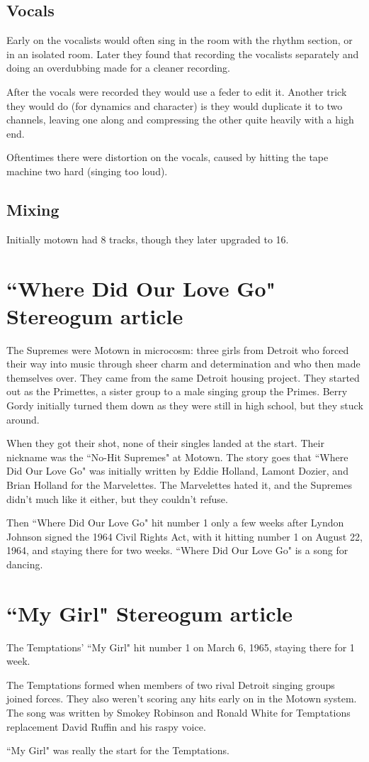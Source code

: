 \documentclass[12pt, a4paper, twoside, openright, titlepage]{book}
\begin{document}
\subsection{Vocals}

Early on the vocalists would often sing in the room with the rhythm section, or in an isolated room. Later they found that recording the vocalists separately and doing an overdubbing made for a cleaner recording.

After the vocals were recorded they would use a feder to edit it. Another trick they would do (for dynamics and character) is they would duplicate it to two channels, leaving one along and compressing the other quite heavily with a high end.

Oftentimes there were distortion on the vocals, caused by hitting the tape machine two hard (singing too loud). 


\subsection{Mixing}

Initially motown had 8 tracks, though they later upgraded to 16. 


\section{``Where Did Our Love Go" Stereogum article}

The Supremes were Motown in microcosm: three girls from Detroit who forced their way into music through sheer charm and determination and who then made themselves over. They came from the same Detroit housing project. They started out as the Primettes, a sister group to a male singing group the Primes. Berry Gordy initially turned them down as they were still in high school, but they stuck around. 

When they got their shot, none of their singles landed at the start. Their nickname was the ``No-Hit Supremes" at Motown. The story goes that ``Where Did Our Love Go" was initially written by Eddie Holland, Lamont Dozier, and Brian Holland for the Marvelettes. The Marvelettes hated it, and the Supremes didn't much like it either, but they couldn't refuse. 

Then ``Where Did Our Love Go" hit number 1 only a few weeks after Lyndon Johnson signed the 1964 Civil Rights Act, with it hitting number 1 on August 22, 1964, and staying there for two weeks. ``Where Did Our Love Go" is a song for dancing. 


\section{``My Girl" Stereogum article}

The Temptations' ``My Girl" hit number 1 on March 6, 1965, staying there for 1 week.


The Temptations formed when members of two rival Detroit singing groups joined forces. They also weren't scoring any hits early on in the Motown system. The song was written by Smokey Robinson and Ronald White for Temptations replacement David Ruffin and his raspy voice. 

``My Girl" was really the start for the Temptations.
\end{document}
